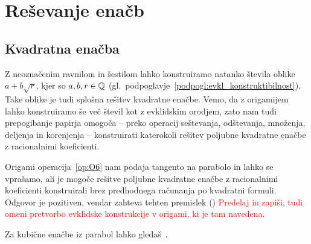 \section{Reševanje enačb}
\label{pogl:enacbe}



\subsection{Kvadratna enačba}

Z neoznačenim ravnilom in šestilom  lahko konstruiramo natanko števila oblike $a + b\sqrt{r}$, kjer so $a, b, r \in \mathbb Q$ (gl.\ podpoglavje~\ref{podpogl:evkl_konstruktibilnost}). Take oblike je tudi splošna rešitev kvadratne enačbe. Vemo, da z origamijem lahko konstruiramo še več števil kot z evklidskim orodjem, zato nam tudi prepogibanje papirja omogoča -- preko operacij seštevanja, odštevanja, množenja, deljenja in korenjenja -- konstruirati katerokoli rešitev poljubne kvadratne enačbe z racionalnimi koeficienti.

Origami operacija~\ref{op:O6} nam podaja tangento na parabolo in lahko se vprašamo, ali je mogoče rešitve poljubne kvadratne enačbe z racionalnimi koeficienti konstruirali brez predhodnega računanja po kvadratni formuli. Odgovor je pozitiven, vendar zahteva tehten premislek (\cite[str.\ 36--38]{hull2020}) \textcolor{red}{Predelaj in zapiši, tudi omeni pretvorbo evklidske konstrukcije v origami, ki je tam navedena.}


Za kubične enačbe iz parabol lahko gledaš~\cite[str.\ 150]{geometricconstructions}.